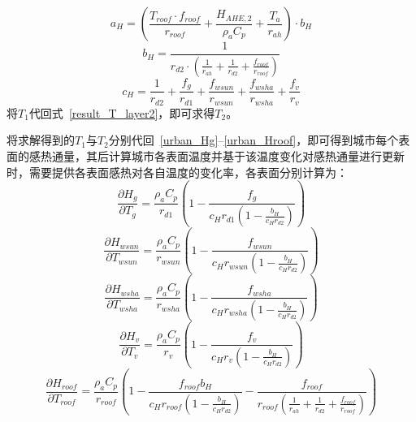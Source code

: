 %
\begin{equation}
    a_{H} = \left(\frac{T_{roof} \cdot f_{roof}}{r_{roof}} + \frac{H_{AHE,2}}{\rho _a C_p} + \frac{T_a}{r_{ah}}\right) \cdot b_{H}
\end{equation}
%
\begin{equation}
    b_{H} = \frac{1}{r_{d2} \cdot \left(\frac{1}{r_{ah}} + \frac{1}{r_{d2}} + \frac{f_{roof}}{r_{roof}} \right)}
\end{equation}
%
\begin{equation}
    c_{H} = \frac{1}{r_{d2}} + \frac{f_{g}}{r_{d1}} + \frac{f_{wsun}}{r_{wsun}} + \frac{f_{wsha}}{r_{wsha}} + \frac{f_v}{r_{v}}
\end{equation}
将$T_{1}$代回式~\ref{result_T_layer2}，即可求得$T_{2}$。

将求解得到的$T_{1}$与$T_{2}$分别代回~\ref{urban_Hg}--\ref{urban_Hroof}，即可得到城市每个表面的感热通量，其后计算城市各表面温度并基于该温度变化对感热通量进行更新时，需要提供各表面感热对各自温度的变化率，各表面分别计算为：
\begin{equation}
\frac{\partial H_{g}}{\partial T_{g}} = \frac{\rho _a C_p}{r_{d1}} \left(1-\frac{f_g}{c_{H} r_{d1} \left(1-\frac{b_H}{c_{H} r_{d2}}\right)}\right)
\end{equation}
%
\begin{equation}
\frac{\partial H_{wsun}}{\partial T_{wsun}} = \frac{\rho _a C_p}{r_{wsun}} \left(1-\frac{f_{wsun}}{c_{H} r_{wsun} \left(1-\frac{b_H}{c_{H} r_{d2}}\right)}\right)
\end{equation}
%
\begin{equation}
\frac{\partial H_{wsha}}{\partial T_{wsha}} = \frac{\rho _a C_p}{r_{wsha}} \left(1-\frac{f_{wsha}}{c_{H} r_{wsha} \left(1-\frac{b_H}{c_{H} r_{d2}}\right)}\right)
\end{equation}
%
\begin{equation}
\frac{\partial H_{v}}{\partial T_{v}} = \frac{\rho _a C_p}{r_{v}} \left(1-\frac{f_{v}}{c_{H} r_{v} \left(1-\frac{b_H}{c_{H} r_{d2}}\right)}\right)
\end{equation}
%
\begin{equation}
\frac{\partial H_{roof}}{\partial T_{roof}} = \frac{\rho _a C_p}{r_{roof}} \left(1-\frac{f_{roof} b_{H}}{c_{H} r_{roof} \left(1-\frac{b_H}{c_{H} r_{d2}}\right)}-\frac{f_{roof}}{r_{roof}\left(\frac{1}{r_{ah}}+\frac{1}{r_{d2}}+\frac{f_{roof}}{r_{roof}}\right)}\right)
\end{equation}

